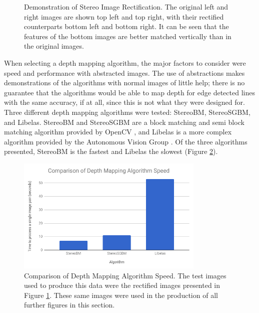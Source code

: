 \begin{figure}[H]
\begin{center}
\begin{tabular}{ c c }
    \end{tabular}
    \caption[Demonstration of Stereo Image Rectification]{Demonstration of Stereo Image Rectification. The original left and right images are shown top left and top right, with their rectified counterparts bottom left and bottom right. It can be seen that the features of the bottom images are better matched vertically than in the original images.}
    \label{fig:rect}
    \end{center}
\end{figure}

When selecting a depth mapping algorithm, the major factors to consider were speed and performance with abstracted images. The use of abstractions makes demonstrations of the algorithms with normal images of little help; there is no guarantee that the algorithms would be able to map depth for edge detected lines with the same accuracy, if at all, since this is not what they were designed for. Three different depth mapping algorithms were tested: StereoBM, StereoSGBM, and Libelas. StereoBM and StereoSGBM are a block matching and semi block matching algorithm provided by OpenCV \cite{OpenCV}, and Libelas is a more complex algorithm provided by the Autonomous Vision Group \cite{geiger2010efficient}. Of the three algorithms presented, StereoBM is the fastest and Libelas the slowest (Figure \ref{fig:speed}). 

\begin{figure}[H]
    \begin{center}
      \includegraphics[width=0.8\textwidth]{Figures/depthspeed.png}
      \caption[Comparison of Depth Mapping Algorithm Speed]{Comparison of Depth Mapping Algorithm Speed. The test images used to produce this data were the rectified images presented in Figure \ref{fig:rect}. These same images were used in the production of all further figures in this section.}
      \label{fig:speed}
    \end{center}
\end{figure}

